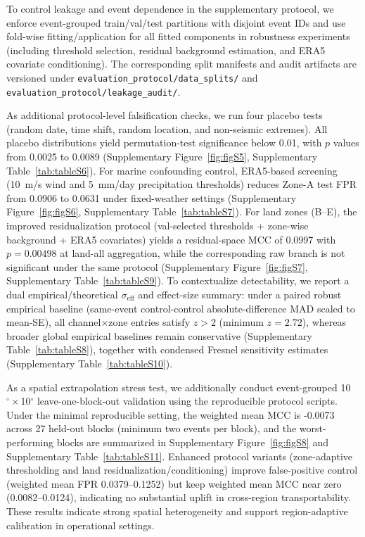 \documentclass[preprint,review,12pt,authoryear]{elsarticle}
\begin{document}
To control leakage and event dependence in the supplementary protocol, we enforce event-grouped train/val/test partitions with disjoint event IDs and use fold-wise fitting/application for all fitted components in robustness experiments (including threshold selection, residual background estimation, and ERA5 covariate conditioning). The corresponding split manifests and audit artifacts are versioned under \texttt{evaluation\_protocol/data\_splits/} and \texttt{evaluation\_protocol/leakage\_audit/}.

As additional protocol-level falsification checks, we run four placebo tests (random date, time shift, random location, and non-seismic extremes). All placebo distributions yield permutation-test significance below 0.01, with $p$ values from 0.0025 to 0.0089 (Supplementary Figure~\ref{fig:figS5}, Supplementary Table~\ref{tab:tableS6}). For marine confounding control, ERA5-based screening (10~m/s wind and 5~mm/day precipitation thresholds) reduces Zone-A test FPR from 0.0906 to 0.0631 under fixed-weather settings (Supplementary Figure~\ref{fig:figS6}, Supplementary Table~\ref{tab:tableS7}). For land zones (B--E), the improved residualization protocol (val-selected thresholds + zone-wise background + ERA5 covariates) yields a residual-space MCC of 0.0997 with $p=0.00498$ at land-all aggregation, while the corresponding raw branch is not significant under the same protocol (Supplementary Figure~\ref{fig:figS7}, Supplementary Table~\ref{tab:tableS9}). To contextualize detectability, we report a dual empirical/theoretical $\sigma_{\mathrm{eff}}$ and effect-size summary: under a paired robust empirical baseline (same-event control-control absolute-difference MAD scaled to mean-SE), all channel$\times$zone entries satisfy $z>2$ (minimum $z=2.72$), whereas broader global empirical baselines remain conservative (Supplementary Table~\ref{tab:tableS8}), together with condensed Fresnel sensitivity estimates (Supplementary Table~\ref{tab:tableS10}).

As a spatial extrapolation stress test, we additionally conduct event-grouped 10$^{\circ}\times$10$^{\circ}$ leave-one-block-out validation using the reproducible protocol scripts. Under the minimal reproducible setting, the weighted mean MCC is -0.0073 across 27 held-out blocks (minimum two events per block), and the worst-performing blocks are summarized in Supplementary Figure~\ref{fig:figS8} and Supplementary Table~\ref{tab:tableS11}. Enhanced protocol variants (zone-adaptive thresholding and land residualization/conditioning) improve false-positive control (weighted mean FPR 0.0379--0.1252) but keep weighted mean MCC near zero (0.0082--0.0124), indicating no substantial uplift in cross-region transportability. These results indicate strong spatial heterogeneity and support region-adaptive calibration in operational settings.
\end{document}
